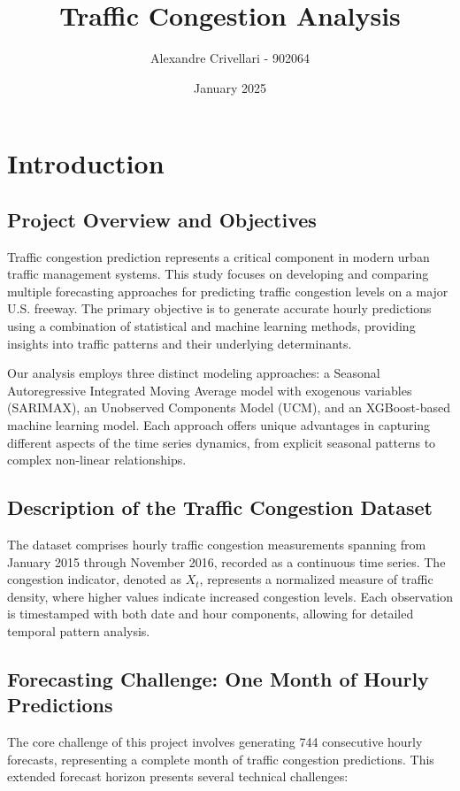 \documentclass{article}
\title{Traffic Congestion Analysis}
\author{Alexandre Crivellari - 902064}
\date{January 2025}
\begin{document}
\maketitle

\section{Introduction}

\subsection{Project Overview and Objectives}
Traffic congestion prediction represents a critical component in modern urban traffic management systems. This study focuses on developing and comparing multiple forecasting approaches for predicting traffic congestion levels on a major U.S. freeway. The primary objective is to generate accurate hourly predictions using a combination of statistical and machine learning methods, providing insights into traffic patterns and their underlying determinants.

Our analysis employs three distinct modeling approaches: a Seasonal Autoregressive Integrated Moving Average model with exogenous variables (SARIMAX), an Unobserved Components Model (UCM), and an XGBoost-based machine learning model. Each approach offers unique advantages in capturing different aspects of the time series dynamics, from explicit seasonal patterns to complex non-linear relationships.

\subsection{Description of the Traffic Congestion Dataset}
The dataset comprises hourly traffic congestion measurements spanning from January 2015 through November 2016, recorded as a continuous time series. The congestion indicator, denoted as $X_t$, represents a normalized measure of traffic density, where higher values indicate increased congestion levels. Each observation is timestamped with both date and hour components, allowing for detailed temporal pattern analysis.

\subsection{Forecasting Challenge: One Month of Hourly Predictions}
The core challenge of this project involves generating 744 consecutive hourly forecasts, representing a complete month of traffic congestion predictions. This extended forecast horizon presents several technical challenges:
\end{document}
